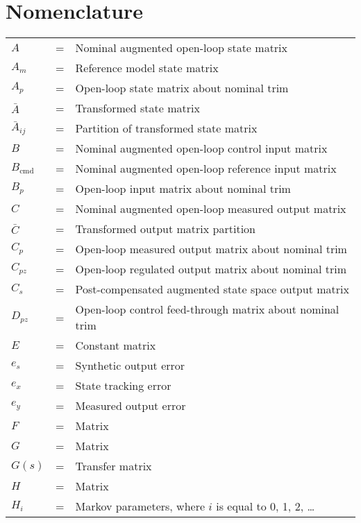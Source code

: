 \documentclass[]{../sty/JGCD}
\theoremstyle{examplestyle}
\begin{document}
  \maketitle

  \section*{Nomenclature}
  \noindent
  \begin{longtable}[l]{@{}lcl@{}}
    $A$ &=& Nominal augmented open-loop state matrix \\
    $A_{m}$ &=& Reference model state matrix \\
    $A_{p}$ &=& Open-loop state matrix about nominal trim\\
    $\bar{A}$ &=& Transformed state matrix \\
    $\bar{A}_{ij}$ &=& Partition of transformed state matrix \\
    $B$ &=& Nominal augmented open-loop control input matrix \\
    $B_{\text{cmd}}$ &=& Nominal augmented open-loop reference input matrix \\
    $B_{p}$ &=& Open-loop input matrix about nominal trim \\
    $C$ &=& Nominal augmented open-loop measured output matrix \\
    $\bar{C}$ &=& Transformed output matrix partition \\
    $C_{p}$ &=& Open-loop measured output matrix about nominal trim \\
    $C_{pz}$ &=& Open-loop regulated output matrix about nominal trim \\
    $C_{s}$ &=& Post-compensated augmented state space output matrix \\
    $D_{pz}$ &=& Open-loop control feed-through matrix about nominal trim \\
    $E$ &=& Constant matrix \\
    $e_{s}$ &=& Synthetic output error \\
    $e_{x}$ &=& State tracking error \\
    $e_{y}$ &=& Measured output error \\
    $F$ &=& Matrix \\
    $G$ &=& Matrix \\
    $G(s)$ &=& Transfer matrix \\
    $H$ &=& Matrix \\
    $H_{i}$ &=& Markov parameters, where $i$ is equal to 0, 1, 2, \dots \\

\end{longtable}
\end{document}
